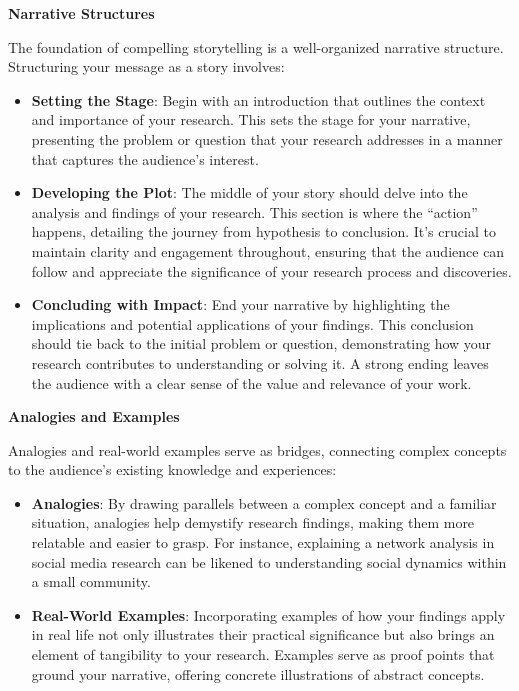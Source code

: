 \documentclass[
]{book}
\begin{document}
\textbf{Narrative Structures}

The foundation of compelling storytelling is a well-organized narrative structure. Structuring your message as a story involves:

\begin{itemize}
\item
  \textbf{Setting the Stage}: Begin with an introduction that outlines the context and importance of your research. This sets the stage for your narrative, presenting the problem or question that your research addresses in a manner that captures the audience's interest.
\item
  \textbf{Developing the Plot}: The middle of your story should delve into the analysis and findings of your research. This section is where the ``action'' happens, detailing the journey from hypothesis to conclusion. It's crucial to maintain clarity and engagement throughout, ensuring that the audience can follow and appreciate the significance of your research process and discoveries.
\item
  \textbf{Concluding with Impact}: End your narrative by highlighting the implications and potential applications of your findings. This conclusion should tie back to the initial problem or question, demonstrating how your research contributes to understanding or solving it. A strong ending leaves the audience with a clear sense of the value and relevance of your work.
\end{itemize}

\textbf{Analogies and Examples}

Analogies and real-world examples serve as bridges, connecting complex concepts to the audience's existing knowledge and experiences:

\begin{itemize}
\item
  \textbf{Analogies}: By drawing parallels between a complex concept and a familiar situation, analogies help demystify research findings, making them more relatable and easier to grasp. For instance, explaining a network analysis in social media research can be likened to understanding social dynamics within a small community.
\item
  \textbf{Real-World Examples}: Incorporating examples of how your findings apply in real life not only illustrates their practical significance but also brings an element of tangibility to your research. Examples serve as proof points that ground your narrative, offering concrete illustrations of abstract concepts.
\end{itemize}
\end{document}
